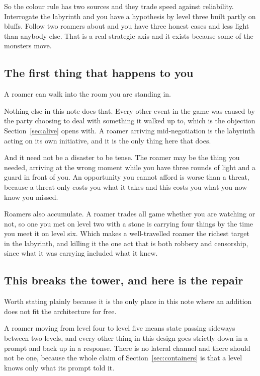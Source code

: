 \documentclass[11pt,a4paper]{article}
\begin{document}
\begin{sectionbox}
So the colour rule has two sources and they trade speed against reliability. Interrogate the
labyrinth and you have a hypothesis by level three built partly on bluffs. Follow two roamers about
and you have three honest cases and less light than anybody else. That is a real strategic axis and
it exists because some of the monsters move.
\end{sectionbox}

\subsection{The first thing that happens to you}

A roamer can walk into the room you are standing in.

Nothing else in this note does that. Every other event in the game was caused by the party
choosing to deal with something it walked up to, which is the objection Section~\ref{sec:alive}
opens with. A roamer arriving mid-negotiation is the labyrinth acting on its own initiative, and it
is the only thing here that does.

\begin{alarmbox}
And it need not be a disaster to be tense. The roamer may be the thing you needed, arriving at the
wrong moment while you have three rounds of light and a guard in front of you. An opportunity you
cannot afford is worse than a threat, because a threat only costs you what it takes and this costs
you what you now know you missed.
\end{alarmbox}

Roamers also accumulate. A roamer trades all game whether you are watching or not, so one you met
on level two with a stone is carrying four things by the time you meet it on level six. Which makes
a well-travelled roamer the richest target in the labyrinth, and killing it the one act that is
both robbery and censorship, since what it was carrying included what it knew.

\subsection{This breaks the tower, and here is the repair}

Worth stating plainly because it is the only place in this note where an addition does not fit the
architecture for free.

A roamer moving from level four to level five means state passing sideways between two levels, and
every other thing in this design goes strictly down in a prompt and back up in a response. There is
no lateral channel and there should not be one, because the whole claim of
Section~\ref{sec:containers} is that a level knows only what its prompt told it.
\end{document}
